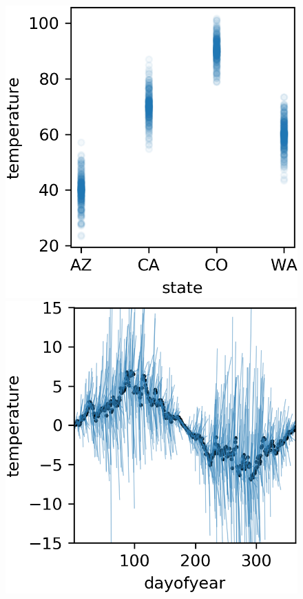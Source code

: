 \documentclass[12pt]{article}
\begin{document}
\begin{figure}[htbp]
\begin{center}
\includegraphics[scale=0.7]{images/state_vs_temp.png}
\includegraphics[scale=0.7]{images/dayofyear_vs_temp_stratpd.png}

\end{center}
\end{figure}
\end{document}
